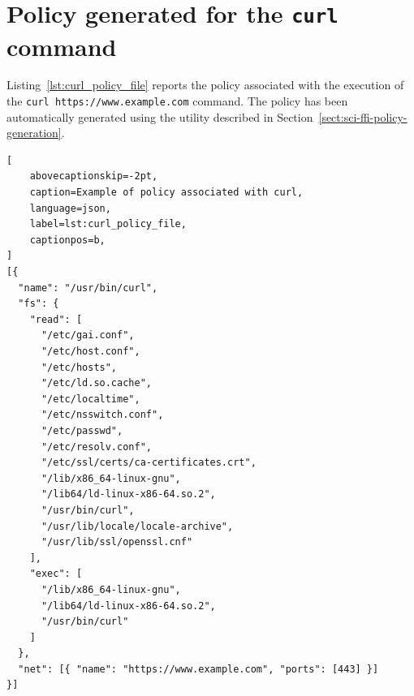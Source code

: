 \chapter{Policy generated for the \texttt{curl} command}\label{appendix:curl_policy}

Listing~\ref{lst:curl_policy_file} reports the policy associated with
the execution of the {\tt curl https://www.example.com} command. The policy has
been automatically generated using the utility described in
Section~\ref{sect:sci-ffi-policy-generation}.

\begin{lstlisting}[
    abovecaptionskip=-2pt,
    caption=Example of policy associated with curl,
    language=json,
    label=lst:curl_policy_file,
    captionpos=b,
]
[{
  "name": "/usr/bin/curl",
  "fs": {
    "read": [
      "/etc/gai.conf",
      "/etc/host.conf",
      "/etc/hosts",
      "/etc/ld.so.cache",
      "/etc/localtime",
      "/etc/nsswitch.conf",
      "/etc/passwd",
      "/etc/resolv.conf",
      "/etc/ssl/certs/ca-certificates.crt",
      "/lib/x86_64-linux-gnu",
      "/lib64/ld-linux-x86-64.so.2",
      "/usr/bin/curl",
      "/usr/lib/locale/locale-archive",
      "/usr/lib/ssl/openssl.cnf"
    ],
    "exec": [
      "/lib/x86_64-linux-gnu",
      "/lib64/ld-linux-x86-64.so.2",
      "/usr/bin/curl"
    ]
  },
  "net": [{ "name": "https://www.example.com", "ports": [443] }]
}]
\end{lstlisting}
